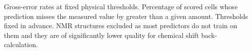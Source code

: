Gross-error rates at fixed physical thresholds. Percentage of scored cells whose prediction misses the measured value by greater than a given amount. Thresholds fixed in advance. NMR structures excluded as most predictors do not train on them and they are of significantly lower quality for chemical shift back-calculation.
